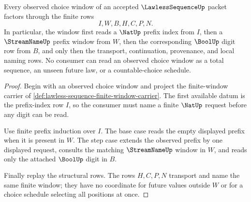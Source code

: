 \begin{theorem}
\label{thm:lawless-sequence-streamname-choice-window}
Every observed choice window of an accepted $\LawlessSequenceUp$ packet factors through the finite rows
$$
I,W,B,H,C,P,N .
$$
In particular, the window first reads a $\NatUp$ prefix index from $I$, then a $\StreamNameUp$ prefix window from $W$, then the corresponding $\BoolUp$ digit row from $B$, and only then the transport, continuation, provenance, and local naming rows. No consumer can read an observed choice window as a total sequence, an unseen future law, or a countable-choice schedule.
\end{theorem}
\begin{proof}
Begin with an observed choice window and project the finite-window carrier of \autoref{def:lawless-sequence-finite-window-carrier}. The first available datum is the prefix-index row $I$, so the consumer must name a finite $\NatUp$ request before any digit can be read.

Use finite prefix induction over $I$. The base case reads the empty displayed prefix when it is present in $W$. The step case extends the observed prefix by one displayed request, consults the matching $\StreamNameUp$ window in $W$, and reads only the attached $\BoolUp$ digit in $B$.

Finally replay the structural rows. The rows $H,C,P,N$ transport and name the same finite window; they have no coordinate for future values outside $W$ or for a choice schedule selecting all positions at once.
\end{proof}

